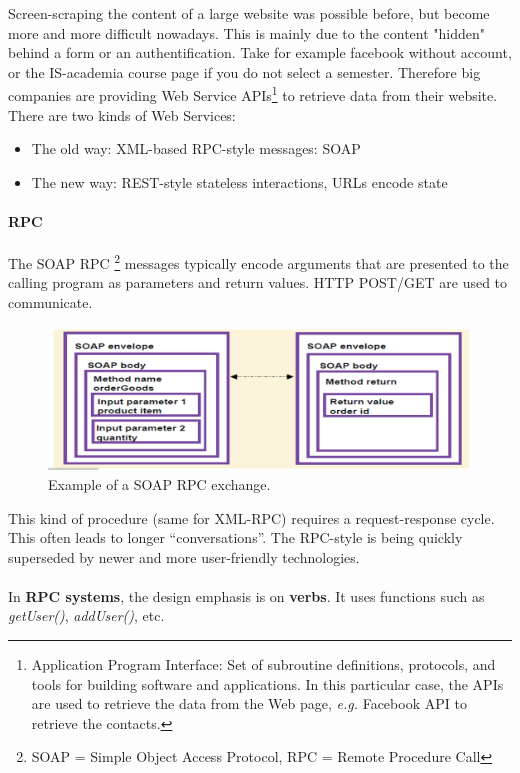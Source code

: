 Screen-scraping the content of a large website was possible before, but become more and more difficult nowadays. This is mainly due to the content "hidden" behind a form or an authentification. Take for example facebook without account, or the IS-academia course page if you do not select a semester. Therefore big companies are providing Web Service APIs\footnote{Application Program Interface: Set of subroutine definitions, protocols, and tools for building software and applications. In this particular case, the APIs are used to retrieve the data from the Web page, {\it e.g.} Facebook API to retrieve the contacts.} to retrieve data from their website. There are two kinds of Web Services:
\begin{itemize}
 \item The old way: XML-based RPC-style messages: SOAP
 \item The new way: REST-style stateless interactions, URLs encode state
\end{itemize}

\paragraph{RPC}

The SOAP RPC \footnote{SOAP = Simple Object Access Protocol, RPC = Remote Procedure Call} messages typically encode arguments that are presented to the calling program as parameters and return values. HTTP POST/GET are used to communicate.
\begin{figure}[H]%
 \centering
 \includegraphics[width=13cm]{./pic/soap-rpc}
 \caption{\label{pic:soap-rpc} Example of a SOAP RPC exchange.}
\end{figure}
This kind of procedure (same for XML-RPC) requires a request-response cycle. This often leads to longer ``conversations''. The RPC-style is being quickly superseded by newer and more user-friendly technologies.\\\\
In {\bf RPC systems}, the design emphasis is on {\bf verbs}. It uses functions such as {\it getUser()}, {\it addUser()}, etc.


